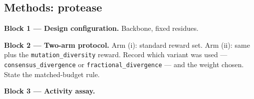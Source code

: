\subsection{Methods: protease}
\label{sec:met:protease}

\begin{planlist}
  \item \textbf{Block 1 --- Design configuration.} Backbone, fixed residues.
  \item \textbf{Block 2 --- Two-arm protocol.} Arm (i): standard reward set.
        Arm (ii): same plus the \texttt{mutation\_diversity} reward. Record
        which variant was used --- \texttt{consensus\_divergence} or
        \texttt{fractional\_divergence} --- and the weight chosen. State the
        matched-budget rule.
  \item \textbf{Block 3 --- Activity assay.}
\end{planlist}
